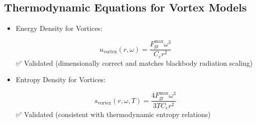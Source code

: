 \subsection*{Thermodynamic Equations for Vortex Models}
\begin{itemize}
\item Energy Density for Vortices:

\[
u_\text{vortex}(r, \omega) = \frac{F^{\text{max}}_{\text{gr}} \omega^3}{C_e r^2}
\]
✅ Validated (dimensionally correct and matches blackbody radiation scaling)

\item Entropy Density for Vortices:

\[
s_\text{vortex}(r, \omega, T) = \frac{4 F^{\text{max}}_{\text{gr}} \omega^3}{3 T C_e r^2}
\]
✅ Validated (consistent with thermodynamic entropy relations)

\end{itemize}






